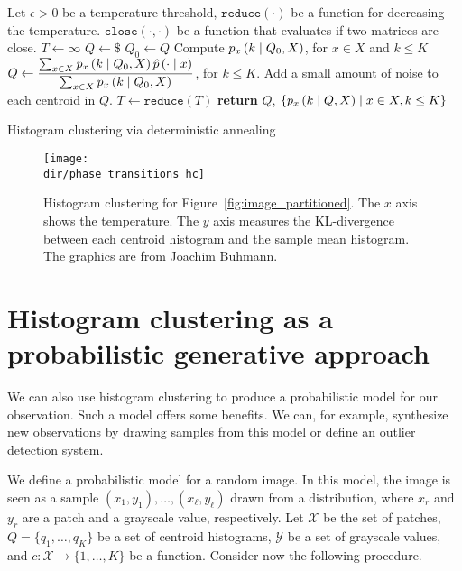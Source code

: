 \begin{algorithm}
\begin{algorithmic}[1]
\State Let
\State \qquad $\epsilon > 0$ be a temperature threshold,
\State \qquad $\texttt{reduce}(\cdot)$ be a function for decreasing the temperature.
\State \qquad $\texttt{close}\left(\cdot, \cdot\right)$ be a function that evaluates if two matrices are close.
\State $T \gets \infty$ 
\State $Q \gets \$$ 
\Repeat
\State $Q_0 \gets Q$
\State Compute $p_{x} \left(k\mid Q_0, X\right)$, for $x \in X$ and $k \leq K$
\State $\displaystyle Q \gets \frac{\sum_{x \in X} p_{x} \left(k\mid Q_0, X\right) \hat{p}\left(\cdot \mid x\right)}{\sum_{x \in X} p_{x} \left(k\mid Q_0, X\right)}$, for $k \leq K$.
\State Add a small amount of noise to each centroid in $Q$.
\State $T \gets \texttt{reduce}(T)$
\EndWhile
\State \textbf{return} $Q$, $\{p_{x} \left(k\mid Q, X\right) \mid x \in X, k \leq K\}$
\EndFunction
\end{algorithmic}
\caption{Histogram clustering via deterministic annealing}
\label{algo:histo_cluster}
\end{algorithm}

\begin{figure}[hbtp]
\centering
\texttt{[image: \\dir/phase\_transitions\_hc]}
\caption{Histogram clustering for Figure~\ref{fig:image_partitioned}. The $x$ axis shows the temperature. The $y$ axis measures the KL-divergence between each centroid histogram and the sample mean histogram. The graphics are from Joachim Buhmann.}
\label{fig:phase_transitions_hc}
\end{figure}

\section{Histogram clustering as a probabilistic generative approach}

We can also use histogram clustering to produce a probabilistic model for
our observation. Such a model offers some benefits. We can, for example,
synthesize new observations by drawing samples from this model or define
an outlier detection system.

We define a probabilistic model for a random image. In this model, the
image is seen as a sample $(x_1, y_1), \ldots, (x_\ell, y_\ell)$ drawn from a distribution,
where $x_r$ and $y_r$ are a patch and a grayscale value, respectively. Let $\mathcal{X}$ be
the set of patches, $Q = \{q_1, \ldots, q_K\}$ be a set of centroid histograms, $\mathcal{Y}$ be
a set of grayscale values, and $c: \mathcal{X} \to \{1,\ldots, K\}$ be a function. Consider
now the following procedure.

